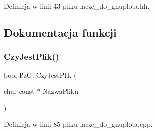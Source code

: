 Definicja w linii 43 pliku lacze\+\_\+do\+\_\+gnuplota.\+hh.



\subsection{Dokumentacja funkcji}
\mbox{\label{namespace_pz_g_ae1ae4d36f66c77879380ba73da8e20e3}} 
\subsubsection{\texorpdfstring{Czy\+Jest\+Plik()}{CzyJestPlik()}}
{\footnotesize\ttfamily bool Pz\+G\+::\+Czy\+Jest\+Plik (\begin{DoxyParamCaption}\item[{char const $\ast$}]{Nazwa\+Pliku }\end{DoxyParamCaption})}



Definicja w linii 85 pliku lacze\+\_\+do\+\_\+gnuplota.\+cpp.

